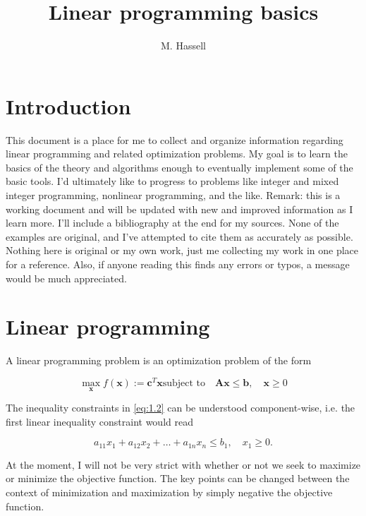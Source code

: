 \documentclass[12pt,english]{article}
\title{Linear programming basics}
\author{M. Hassell}
\begin{document}
\maketitle

\section{Introduction}\label{sec:1}

This document is a place for me to collect and organize information regarding linear programming and related optimization problems.  My goal is to learn the basics of the theory and algorithms enough to eventually implement some of the basic tools.  I'd ultimately like to progress to problems like integer and mixed integer programming, nonlinear programming, and the like.  Remark: this is a working document and will be updated with new and improved information as I learn more.   I'll include a bibliography at the end for my sources.  None of the examples are original, and I've attempted to cite them as accurately as possible.  Nothing here is original or my own work, just me collecting my work in one place for a reference.  Also, if anyone reading this finds any errors or typos, a message would be much appreciated.

\section{Linear programming}\label{sec:2}

A linear programming problem is an optimization problem of the form

\begin{subequations}
\begin{equation}\label{eq:1.1}
\max_\mathbf{x} f(\mathbf x)  := \mathbf{c}^T \mathbf{x}
\end{equation}
\begin{equation}\label{eq:1.2}
\text{subject to} \quad \mathbf{A}\mathbf{x} \leq \mathbf{b}, \quad \mathbf{x}\geq 0
\end{equation}
\end{subequations}

The inequality constraints in \eqref{eq:1.2} can be understood component-wise, i.e. the first linear inequality constraint would read

$$
a_{11}x_1 + a_{12}x_2 + \dots + a_{1n}x_n \leq b_1, \quad x_1 \geq 0.
$$

At the moment, I will not be very strict with whether or not we seek to maximize or minimize the objective function.  The key points can be changed between the context of minimization and maximization by simply negative the objective function.
\end{document}
